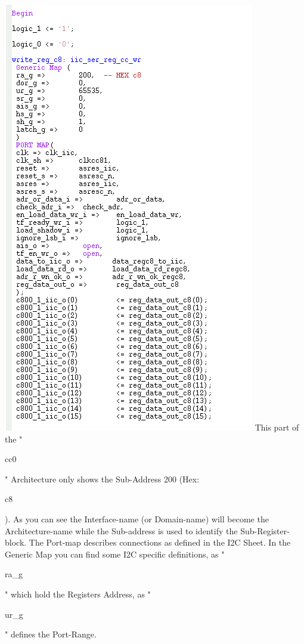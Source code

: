 \documentclass[a4paper,12pt]{report}
\begin{document}
\newline
\includegraphics[scale=0.9]{images/FRCA_part1_arch.png}\newline
This part of the "\begin{tt}cc0\end{tt}" Architecture only shows the Sub-Address 200 (Hex: \begin{tt}c8\end{tt}). As you can see the Interface-name (or Domain-name) will become the Architecture-name while the Sub-address is used to identify the Sub-Register-block. The Port-map describes connections as defined in the I2C Sheet. In the Generic Map you can find some I2C specific definitions, as "\begin{tt}ra\_g\end{tt}" which hold the Registers Address, as "\begin{tt}ur\_g\end{tt}" defines the Port-Range.
\end{document}
